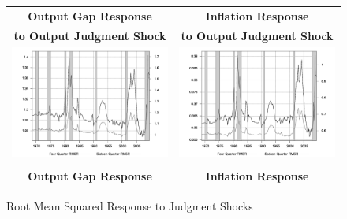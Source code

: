 \documentclass[12pt]{article}
\begin{document}
{\begin{figure}\caption{Root Mean Squared Response to Judgment Shocks}\label{fg:irf_judgment_size}
\hspace*{-2pc}
\begin{tabular}{cc}\\
\textbf{Output Gap Response} & \textbf{Inflation Response} \\
\textbf{to Output Judgment Shock} & \textbf{to Output Judgment Shock}  \\
\includegraphics[scale=0.17]{images/RMS16_Output_Gap_Output_Judgment_Shock.png} & \includegraphics[scale=0.17]{images/RMS16_Inflation_Output_Judgment_Shock.png} \\\\
\textbf{Output Gap Response} & \textbf{Inflation Response} \\ 

\end{tabular}
\end{figure}}
\end{document}
